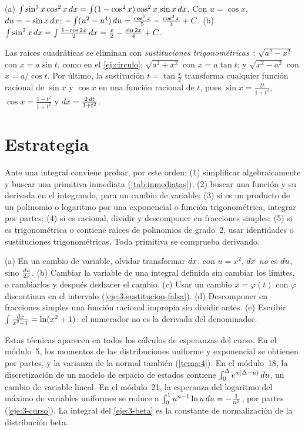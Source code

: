 \begin{ejemplo}\label{ej:trig}
(a) $\int\sin^{3}x\cos^{2}x\mathop{}\!d x=\int(1-\cos^{2}x)\cos^{2}x\,\sin x\mathop{}\!d x$. Con $u=\cos x$, $\mathop{}\!d u=-\sin x\mathop{}\!d x$: $-\int(u^{2}-u^{4})\mathop{}\!d u=\frac{\cos^{5}x}{5}-\frac{\cos^{3}x}{3}+C$.
(b) $\int\sin^{2}x\mathop{}\!d x=\int\frac{1-\cos2x}{2}\mathop{}\!d x=\frac x2-\frac{\sin2x}{4}+C$.
\end{ejemplo}

Las raíces cuadráticas se eliminan con \emph{sustituciones trigonométricas}~\cite[§3.3]{openstax2}: $\sqrt{a^{2}-x^{2}}$ con $x=a\sin t$, como en el \cref{ej:circulo}; $\sqrt{a^{2}+x^{2}}$ con $x=a\tan t$; y $\sqrt{x^{2}-a^{2}}$ con $x=a/\cos t$. Por último, la sustitución $t=\tan\frac x2$ transforma cualquier función racional de $\sin x$ y $\cos x$ en una función racional de $t$, pues $\sin x=\frac{2t}{1+t^{2}}$, $\cos x=\frac{1-t^{2}}{1+t^{2}}$ y $\mathop{}\!d x=\frac{2\mathop{}\!d t}{1+t^{2}}$.

\section{Estrategia}

Ante una integral conviene probar, por este orden: (1) simplificar algebraicamente y buscar una primitiva inmediata (\cref{tab:inmediatas}); (2) buscar una función y su derivada en el integrando, para un cambio de variable; (3) si es un producto de un polinomio o logaritmo por una exponencial o función trigonométrica, integrar por partes; (4) si es racional, dividir y descomponer en fracciones simples; (5) si es trigonométrica o contiene raíces de polinomios de grado~2, usar identidades o sustituciones trigonométricas. Toda primitiva se comprueba derivando.

\begin{observacion}\label{obs:3-errores}
(a) En un cambio de variable, olvidar transformar $\mathop{}\!d x$: con $u=x^{2}$, $\mathop{}\!d x$ \emph{no} es $\mathop{}\!d u$, sino $\frac{\mathop{}\!d u}{2x}$. (b) Cambiar la variable de una integral definida sin cambiar los límites, o cambiarlos y después deshacer el cambio. (c) Usar un cambio $x=\varphi(t)$ con $\varphi$ discontinua en el intervalo (\cref{eje:3-sustitucion-falsa}). (d) Descomponer en fracciones simples una función racional impropia sin dividir antes. (e) Escribir $\int\frac{\mathop{}\!d x}{x^{2}+1}=\ln(x^{2}+1)$: el numerador no es la derivada del denominador.
\end{observacion}

\begin{observacion}
Estas técnicas aparecen en todos los cálculos de esperanzas del curso. En el módulo~5, los momentos de las distribuciones uniforme y exponencial se obtienen por partes, y la varianza de la normal también (\cref{tema:4}). En el módulo~18, la discretización de un modelo de espacio de estados contiene $\int_0^{\Delta}e^{a(\Delta-u)}\mathop{}\!d u$, un cambio de variable lineal. En el módulo~21, la esperanza del logaritmo del máximo de variables uniformes se reduce a $\int_0^1u^{n-1}\ln u\mathop{}\!d u=-\frac{1}{n^{2}}$, por partes (\cref{eje:3-curso}). La integral del \cref{eje:3-beta} es la constante de normalización de la distribución beta.
\end{observacion}

